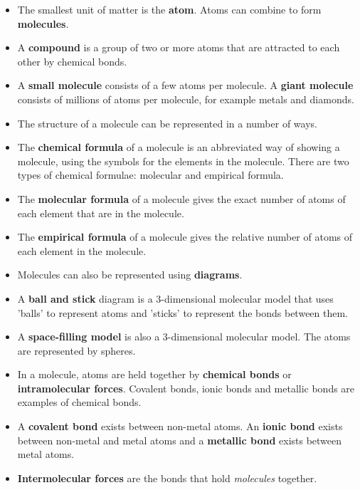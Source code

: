       \label{m38120*id311034}\begin{itemize}[noitemsep]
            \label{m38120*uid67}\item The smallest unit of matter is the \textbf{atom}. Atoms can combine to form \textbf{molecules}.
\label{m38120*uid68}\item A \textbf{compound} is a 
group of two or more atoms that are attracted to each other by chemical bonds.
\label{m38120*uid69}\item A \textbf{small molecule} 
consists of a few atoms per molecule. A \textbf{giant 
molecule} consists of millions of atoms per molecule, for example 
metals and diamonds.
\label{m38120*uid70}\item The structure of a molecule can be represented in a 
number of ways.
\label{m38120*uid71}\item The \textbf{chemical formula} 
of a molecule is an abbreviated way of showing a molecule, using the symbols for 
the elements in the molecule. There are two types of chemical formulae: 
molecular and empirical formula.
\label{m38120*uid72}\item The \textbf{molecular 
formula} of a molecule gives the exact number of atoms of each element 
that are in the molecule.
\label{m38120*uid73}\item The \textbf{empirical 
formula} of a molecule gives the relative number of atoms of each 
element in the molecule.
\label{m38120*uid74}\item Molecules can also be represented using \textbf{diagrams}.
\label{m38120*uid75}\item A \textbf{ball and stick} 
diagram is a 3-dimensional molecular model that uses 'balls' to represent atoms 
and 'sticks' to represent the bonds between them.
\label{m38120*uid76}\item A \textbf{space-filling 
model} is also a 3-dimensional molecular model. The atoms are 
represented by spheres.
\label{m38120*uid77}\item In a molecule, atoms are held together by \textbf{chemical bonds} or \textbf{intramolecular forces}. Covalent bonds, ionic bonds and 
metallic bonds are examples of chemical bonds.
\label{m38120*uid78}\item A \textbf{covalent bond} 
exists between non-metal atoms. An \textbf{ionic bond} 
exists between non-metal and metal atoms and a \textbf{metallic 
bond} exists between metal atoms.
\label{m38120*uid79}\item \textbf{Intermolecular 
forces} are the bonds that hold \textsl{molecules} together.
\end{itemize}
        
